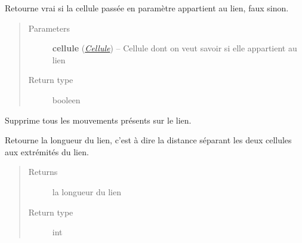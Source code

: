 \documentclass[letterpaper,10pt,english]{sphinxmanual}
\begin{document}
\begin{fulllineitems}
\begin{fulllineitems}
\begin{quote}
\begin{description}
\end{description}\end{quote}

\end{fulllineitems}


\begin{fulllineitems}
\label{index:Lien.Lien.celluleAppartientAuLien}
Retourne vrai si la cellule passée en paramètre appartient au lien, faux sinon.
\begin{quote}\begin{description}
\item[{Parameters}] \leavevmode
\textbf{cellule} ({\hyperref[index:module-Cellule]{\emph{Cellule}}}) -- Cellule dont on veut savoir si elle appartient au lien

\item[{Return type}] \leavevmode
booleen

\end{description}\end{quote}

\end{fulllineitems}


\begin{fulllineitems}
\label{index:Lien.Lien.clearAllMouvements}
Supprime tous les mouvements présents sur le lien.

\end{fulllineitems}


\begin{fulllineitems}
\label{index:Lien.Lien.getDistance}
Retourne la longueur du lien, c'est à dire la distance séparant les deux cellules aux extrémités du lien.
\begin{quote}\begin{description}
\item[{Returns}] \leavevmode
la longueur du lien

\item[{Return type}] \leavevmode
int

\end{description}\end{quote}


\end{fulllineitems}
\end{fulllineitems}
\end{document}
